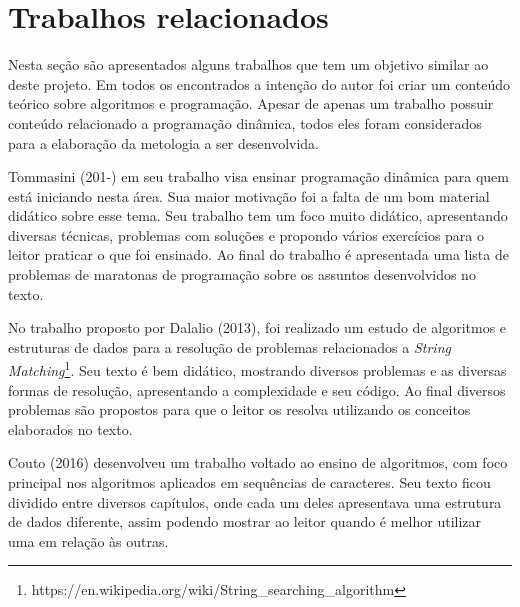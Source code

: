 
\chapter{Trabalhos relacionados}
\label{chap:historico}

Nesta seção são apresentados alguns trabalhos que tem um objetivo similar ao deste projeto. Em todos os encontrados a intenção do autor foi criar um conteúdo teórico sobre algoritmos e programação. Apesar de apenas um trabalho possuir conteúdo relacionado a programação dinâmica, todos eles foram considerados para a elaboração da metologia a ser desenvolvida.

Tommasini (201-) em seu trabalho visa ensinar programação dinâmica para quem está iniciando nesta área. Sua maior motivação foi a falta de um bom material didático sobre esse tema. Seu trabalho tem um foco muito didático, apresentando diversas técnicas, problemas com soluções e propondo vários exercícios para o leitor praticar o que foi ensinado. Ao final do trabalho é apresentada uma lista de problemas de maratonas de programação sobre os assuntos desenvolvidos no texto.


No trabalho proposto por Dalalio (2013), foi realizado um estudo de algoritmos e estruturas de dados para a resolução de problemas relacionados a \textit{String Matching}\footnote{https://en.wikipedia.org/wiki/String\_searching\_algorithm}. Seu texto é bem didático, mostrando diversos problemas e as diversas formas de resolução, apresentando a complexidade e seu código. Ao final diversos problemas são propostos para que o leitor os resolva utilizando os conceitos elaborados no texto.


Couto (2016) desenvolveu um trabalho voltado ao ensino de algoritmos, com foco principal nos algoritmos aplicados em sequências de caracteres. Seu texto ficou dividido entre diversos capítulos, onde cada um deles apresentava uma estrutura de dados diferente, assim podendo mostrar ao leitor quando é melhor utilizar uma em relação às outras.






